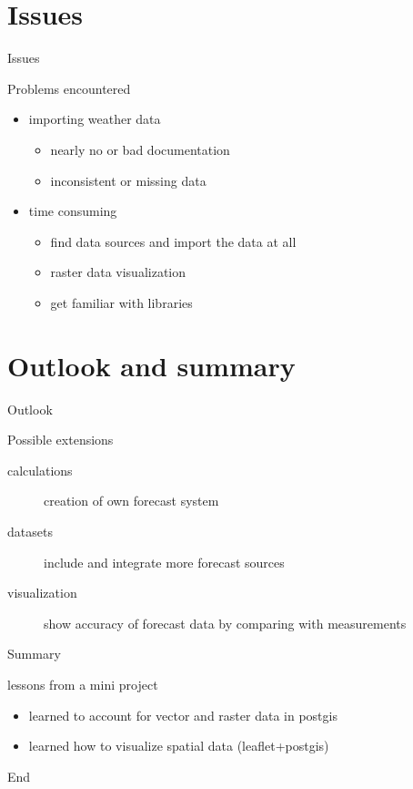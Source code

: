 \documentclass[ucs,9pt]{beamer}
\begin{document}
\section{Issues}
\begin{frame}{Issues}
	\begin{block}{Problems encountered}
		\begin{itemize}
			\item importing weather data
				\begin{itemize}
					\item nearly no or bad documentation
					\item inconsistent or missing data
				\end{itemize}
			\item time consuming
				\begin{itemize}
					\item find data sources and import the data at all
					\item raster data visualization
					\item get familiar with libraries
				\end{itemize}
		\end{itemize}
	\end{block}
\end{frame}

\section{Outlook and summary}
\begin{frame}{Outlook}
		\begin{block}{Possible extensions}
			\begin{description}
				\item [calculations] creation of own forecast system
				\item [datasets] include and integrate more forecast sources
				\item [visualization] show accuracy of forecast data by comparing with
					measurements
			\end{description}
		\end{block}
\end{frame}

\begin{frame}{Summary}
	\begin{block}{lessons from a mini project}
			\begin{itemize}
				\item learned to account for vector and raster data in postgis
				\item learned how to visualize spatial data (leaflet+postgis)
			\end{itemize}
	\end{block}
\end{frame}

\begin{frame}{End}
  \\
  \\
\end{frame}
\end{document}
